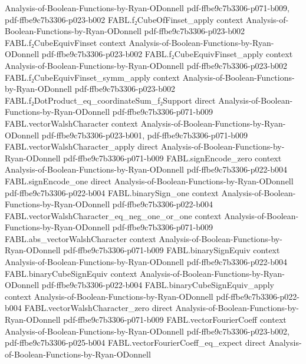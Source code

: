 \begin{theorem}
  {Analysis-of-Boolean-Functions-by-Ryan-ODonnell}
  {pdf-ffbe9c7b3306-p071-b009,
    pdf-ffbe9c7b3306-p023-b002}
\proofstep
  {FABL.f₂CubeOfFinset_apply}
  {context}
  {Analysis-of-Boolean-Functions-by-Ryan-ODonnell}
  {pdf-ffbe9c7b3306-p023-b002}
\proofstep
  {FABL.f₂CubeEquivFinset}
  {context}
  {Analysis-of-Boolean-Functions-by-Ryan-ODonnell}
  {pdf-ffbe9c7b3306-p023-b002}
\proofstep
  {FABL.f₂CubeEquivFinset_apply}
  {context}
  {Analysis-of-Boolean-Functions-by-Ryan-ODonnell}
  {pdf-ffbe9c7b3306-p023-b002}
\proofstep
  {FABL.f₂CubeEquivFinset_symm_apply}
  {context}
  {Analysis-of-Boolean-Functions-by-Ryan-ODonnell}
  {pdf-ffbe9c7b3306-p023-b002}
\proofstep
  {FABL.f₂DotProduct_eq_coordinateSum_f₂Support}
  {direct}
  {Analysis-of-Boolean-Functions-by-Ryan-ODonnell}
  {pdf-ffbe9c7b3306-p071-b009}
\proofstep
  {FABL.vectorWalshCharacter}
  {context}
  {Analysis-of-Boolean-Functions-by-Ryan-ODonnell}
  {pdf-ffbe9c7b3306-p023-b001,
    pdf-ffbe9c7b3306-p071-b009}
\proofstep
  {FABL.vectorWalshCharacter_apply}
  {direct}
  {Analysis-of-Boolean-Functions-by-Ryan-ODonnell}
  {pdf-ffbe9c7b3306-p071-b009}
\proofstep
  {FABL.signEncode_zero}
  {context}
  {Analysis-of-Boolean-Functions-by-Ryan-ODonnell}
  {pdf-ffbe9c7b3306-p022-b004}
\proofstep
  {FABL.signEncode_one}
  {direct}
  {Analysis-of-Boolean-Functions-by-Ryan-ODonnell}
  {pdf-ffbe9c7b3306-p022-b004}
\proofstep
  {FABL.binarySign_one}
  {context}
  {Analysis-of-Boolean-Functions-by-Ryan-ODonnell}
  {pdf-ffbe9c7b3306-p022-b004}
\proofstep
  {FABL.vectorWalshCharacter_eq_neg_one_or_one}
  {context}
  {Analysis-of-Boolean-Functions-by-Ryan-ODonnell}
  {pdf-ffbe9c7b3306-p071-b009}
\proofstep
  {FABL.abs_vectorWalshCharacter}
  {context}
  {Analysis-of-Boolean-Functions-by-Ryan-ODonnell}
  {pdf-ffbe9c7b3306-p071-b009}
\proofstep
  {FABL.binarySignEquiv}
  {context}
  {Analysis-of-Boolean-Functions-by-Ryan-ODonnell}
  {pdf-ffbe9c7b3306-p022-b004}
\proofstep
  {FABL.binaryCubeSignEquiv}
  {context}
  {Analysis-of-Boolean-Functions-by-Ryan-ODonnell}
  {pdf-ffbe9c7b3306-p022-b004}
\proofstep
  {FABL.binaryCubeSignEquiv_apply}
  {context}
  {Analysis-of-Boolean-Functions-by-Ryan-ODonnell}
  {pdf-ffbe9c7b3306-p022-b004}
\proofstep
  {FABL.vectorWalshCharacter_zero}
  {direct}
  {Analysis-of-Boolean-Functions-by-Ryan-ODonnell}
  {pdf-ffbe9c7b3306-p071-b009}
\proofstep
  {FABL.vectorFourierCoeff}
  {context}
  {Analysis-of-Boolean-Functions-by-Ryan-ODonnell}
  {pdf-ffbe9c7b3306-p023-b002,
    pdf-ffbe9c7b3306-p025-b004}
\proofstep
  {FABL.vectorFourierCoeff_eq_expect}
  {direct}
  {Analysis-of-Boolean-Functions-by-Ryan-ODonnell}

\end{theorem}
